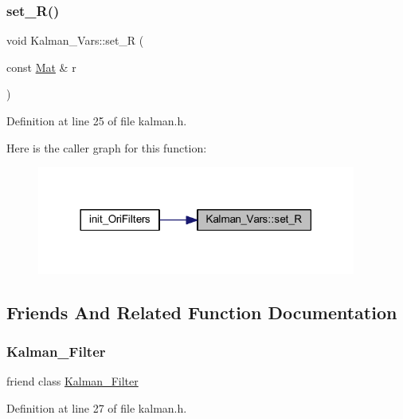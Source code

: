 \subsubsection{\texorpdfstring{set\_R()}{set\_R()}}
{\footnotesize\ttfamily void Kalman\+\_\+\+Vars\+::set\+\_\+R (\begin{DoxyParamCaption}\item[{const \mbox{\hyperlink{class_mat}{Mat}} \&}]{r }\end{DoxyParamCaption})\hspace{0.3cm}{\ttfamily [inline]}}



Definition at line 25 of file kalman.\+h.

Here is the caller graph for this function\+:
\nopagebreak
\begin{figure}[H]
\begin{center}
\leavevmode
\includegraphics[width=297pt]{struct_kalman___vars_a49e035a9f13c4b45fd77215a8bc95309_icgraph}
\end{center}
\end{figure}


\subsection{Friends And Related Function Documentation}
\mbox{\label{struct_kalman___vars_a2a9de2e5af58a1f7f78798d6952f7c66}} 
\subsubsection{\texorpdfstring{Kalman\_Filter}{Kalman\_Filter}}
{\footnotesize\ttfamily friend class \mbox{\hyperlink{class_kalman___filter}{Kalman\+\_\+\+Filter}}\hspace{0.3cm}{\ttfamily [friend]}}



Definition at line 27 of file kalman.\+h.



